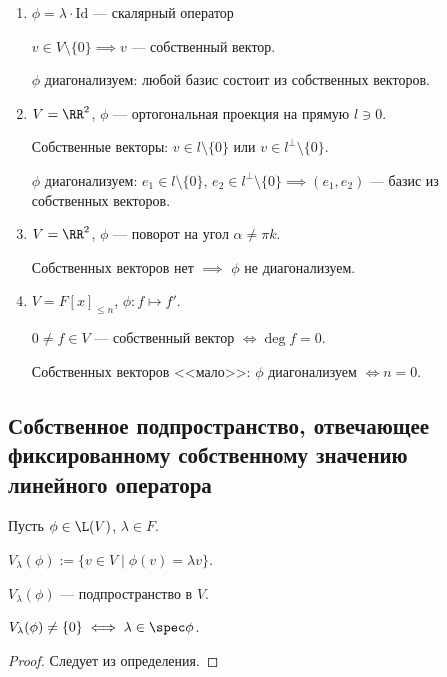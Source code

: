 \begin{enumerate}
    \item $\phi = \lambda \cdot \mathrm{Id}$ --- скалярный оператор

        $v \in V \setminus \{0\} \implies v$ --- собственный вектор.

        {\color{red} $\phi$ диагонализуем}: любой базис состоит из собственных векторов.

    \item $V = \RR^2$, $\phi$ --- ортогональная проекция на прямую $l \ni 0$.

        Собственные векторы: $v \in l \setminus \{0\}$ или $v \in l^{\perp} \setminus \{0\}$.

        {\color{red} $\phi$ диагонализуем}: $e_1 \in l \setminus \{0\}$, $e_2 \in l^{\perp} \setminus \{0\} \implies (e_1, e_2)$ --- базис из собственных векторов.

    \item $V = \RR^2$, $\phi$ --- поворот на угол $\alpha \neq \pi k$.

        Собственных векторов нет $\implies$ {\color{red} $\phi$ не диагонализуем}.

    \item $V = F[x]_{\leq n}$, $\phi \colon f \mapsto f'$.

        $0 \neq f \in V$ --- собственный вектор $\iff \deg f = 0$.

        Собственных векторов {\color{blue} <<мало>>}: {\color{red} $\phi$ диагонализуем $\iff n = 0$}.
\end{enumerate}


\subsection{Собственное подпространство, отвечающее фиксированному собственному значению линейного оператора}

Пусть $\phi \in \L(V)$, $\lambda \in F$.

$V_\lambda(\phi) := \{v \in V \mid \phi(v) = \lambda v\}$.

\begin{exercise}
    $V_\lambda(\phi)$ --- подпространство в $V$.
\end{exercise}

\begin{lemma}
    $V_\lambda(\phi) \neq \{0\} \iff \lambda \in \spec \phi$.
\end{lemma}

\begin{proof}
    Следует из определения.
\end{proof}

